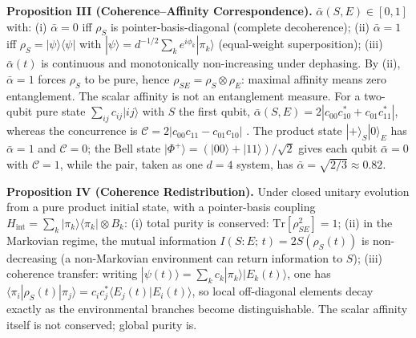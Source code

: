 \begin{tcolorbox}[
  title={The Formal Mathematics: For Readers Who Want It},
  colback=gray!5,
  colframe=gray!50,
  fonttitle=\bfseries,
  breakable
]
\textbf{Proposition III (Coherence–Affinity Correspondence).} $\bar{\alpha}(S,E) \in [0,1]$ with: (i) $\bar{\alpha} = 0$ iff $\rho_S$ is pointer-basis-diagonal (complete decoherence); (ii) $\bar{\alpha} = 1$ iff $\rho_S = |\psi\rangle\langle\psi|$ with $|\psi\rangle = d^{-1/2}\sum_k e^{i\phi_k}|\pi_k\rangle$ (equal-weight superposition); (iii) $\bar{\alpha}(t)$ is continuous and monotonically non-increasing under dephasing. By (ii), $\bar{\alpha} = 1$ forces $\rho_S$ to be pure, hence $\rho_{SE} = \rho_S \otimes \rho_E$: maximal affinity means zero entanglement. The scalar affinity is not an entanglement measure. For a two-qubit pure state $\sum_{ij} c_{ij}|ij\rangle$ with $S$ the first qubit, $\bar{\alpha}(S,E) = 2|c_{00}c_{10}^{*} + c_{01}c_{11}^{*}|$, whereas the concurrence is $\mathcal{C} = 2|c_{00}c_{11} - c_{01}c_{10}|$ \citep{Wootters1998}. The product state $|+\rangle_S|0\rangle_E$ has $\bar{\alpha} = 1$ and $\mathcal{C} = 0$; the Bell state $|\Phi^+\rangle = (|00\rangle + |11\rangle)/\sqrt{2}$ gives each qubit $\bar{\alpha} = 0$ with $\mathcal{C} = 1$, while the pair, taken as one $d = 4$ system, has $\bar{\alpha} = \sqrt{2/3} \approx 0.82$.

\textbf{Proposition IV (Coherence Redistribution).} Under closed unitary evolution from a pure product initial state, with a pointer-basis coupling $H_{\mathrm{int}} = \sum_k |\pi_k\rangle\langle\pi_k| \otimes B_k$: (i) total purity is conserved: $\mathrm{Tr}[\rho_{SE}^2] = 1$; (ii) in the Markovian regime, the mutual information $I(S{:}E;\,t) = 2S(\rho_S(t))$ is non-decreasing (a non-Markovian environment can return information to $S$); (iii) coherence transfer: writing $|\psi(t)\rangle = \sum_k c_k|\pi_k\rangle|E_k(t)\rangle$, one has $\langle\pi_i|\rho_S(t)|\pi_j\rangle = c_i c_j^* \langle E_j(t)|E_i(t)\rangle$, so local off-diagonal elements decay exactly as the environmental branches become distinguishable. The scalar affinity itself is not conserved; global purity is.


\end{tcolorbox}

